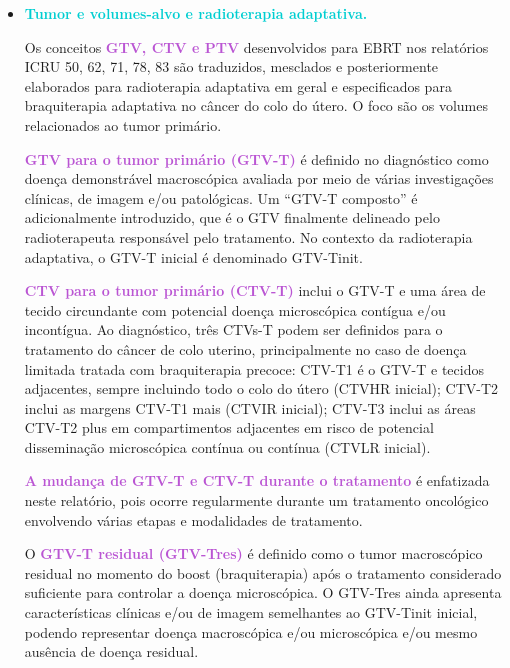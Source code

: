 \documentclass[11pt,a4paper]{article}
\newcounter{exemplo}
\begin{document}
	\begin{exemplo}
		\begin{itemize}[label=\textcolor{CarnationPink}{$\blacksquare$}]
			\item \textcolor{DarkTurquoise}{\LobsterTwo\Large\textbf{Tumor e volumes-alvo e radioterapia adaptativa.}}

			Os conceitos \textcolor{MediumOrchid}{\textbf{GTV, CTV e PTV}} desenvolvidos para EBRT nos relatórios ICRU 50, 62, 71, 78, 83 são traduzidos, mesclados e posteriormente elaborados para radioterapia adaptativa em geral e especificados para braquiterapia adaptativa no câncer do colo do útero. O foco são os volumes relacionados ao tumor primário.

			\textcolor{MediumOrchid}{\textbf{GTV para o tumor primário (GTV-T)}} é definido no diagnóstico como doença demonstrável macroscópica avaliada por meio de várias investigações clínicas, de imagem e/ou patológicas. Um “GTV-T composto” é adicionalmente introduzido, que é o GTV finalmente delineado pelo radioterapeuta responsável pelo tratamento. No contexto da radioterapia adaptativa, o GTV-T inicial é denominado GTV-Tinit.

			\textcolor{MediumOrchid}{\textbf{CTV para o tumor primário (CTV-T)}} inclui o GTV-T e uma área de tecido circundante com potencial doença microscópica contígua e/ou incontígua. Ao diagnóstico, três CTVs-T podem ser definidos para o tratamento do câncer de colo uterino, principalmente no caso de doença limitada tratada com braquiterapia precoce: CTV-T1 é o GTV-T e tecidos adjacentes, sempre incluindo todo o colo do útero (CTVHR inicial); CTV-T2 inclui as margens CTV-T1 mais (CTVIR inicial); CTV-T3 inclui as áreas CTV-T2 plus em compartimentos adjacentes em risco de potencial disseminação microscópica contínua ou contínua (CTVLR inicial).

			\textcolor{MediumOrchid}{\textbf{A mudança de GTV-T e CTV-T durante o tratamento}}  é enfatizada neste relatório, pois ocorre regularmente durante um tratamento oncológico envolvendo várias etapas e modalidades de tratamento.

			O \textcolor{MediumOrchid}{\textbf{GTV-T residual (GTV-Tres)}}  é definido como o tumor macroscópico residual no momento do boost (braquiterapia) após o tratamento considerado suficiente para controlar a doença microscópica. O GTV-Tres ainda apresenta características clínicas e/ou de imagem semelhantes ao GTV-Tinit inicial, podendo representar doença macroscópica e/ou microscópica e/ou mesmo ausência de doença residual.


\end{itemize}
\end{exemplo}
\end{document}
